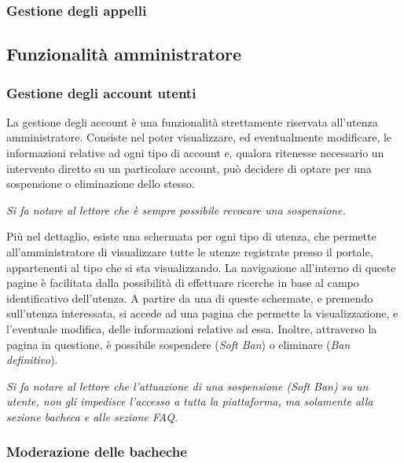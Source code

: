 \documentclass [a4paper,11pt]{book}
\begin{document}
\medskip

\subsubsection{Gestione degli appelli}

\medskip

\subsection{Funzionalità amministratore}

\subsubsection{Gestione degli account utenti}

La gestione degli account è una funzionalità strettamente riservata all'utenza  amministratore. Consiste nel poter visualizzare, ed eventualmente modificare, le informazioni relative ad ogni tipo di account e, qualora ritenesse necessario un intervento diretto su un particolare account, può decidere di optare per una sospensione o eliminazione dello stesso.

\emph{Si fa notare al lettore che è sempre possibile revocare una sospensione.} 

Più nel dettaglio, esiste una schermata per ogni tipo di utenza, che permette all'amministratore di visualizzare tutte le utenze registrate presso il portale, appartenenti al tipo che si sta visualizzando. La navigazione all'interno di queste pagine è facilitata dalla possibilità di effettuare ricerche in base al campo identificativo dell'utenza. 
A partire da una di queste schermate, e premendo sull'utenza interessata, si accede ad una pagina che permette la visualizzazione, e l'eventuale modifica, delle informazioni relative ad essa. Inoltre, attraverso la pagina in questione, è possibile sospendere (\emph{Soft Ban}) o eliminare (\emph{Ban definitivo}).

\medskip

\emph{Si fa notare al lettore che l'attuazione di una sospensione (\emph{Soft Ban}) su un utente, non gli impedisce l'accesso a tutta la piattaforma, ma solamente alla sezione bacheca e alle sezione FAQ.}


\medskip

\subsubsection{Moderazione delle bacheche}
\end{document}
